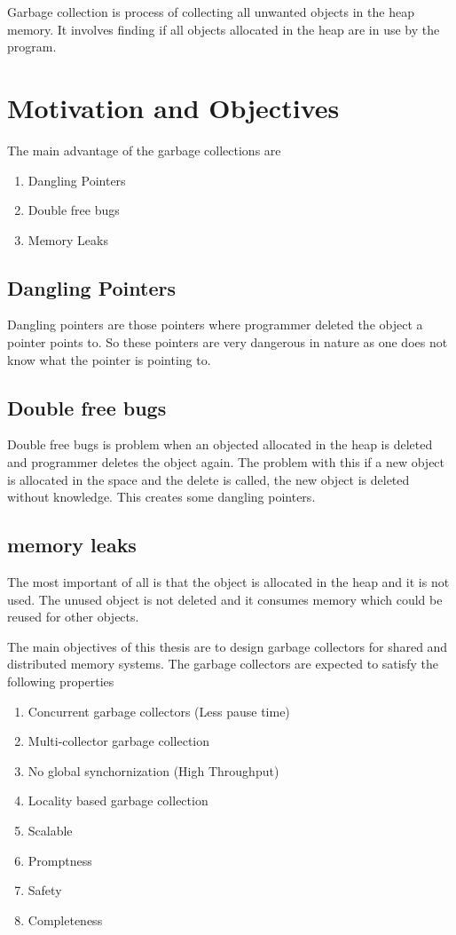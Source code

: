 Garbage collection is process of collecting all unwanted objects in the heap memory. It involves finding if all objects allocated in the heap are in use by the program.
\section{Motivation and Objectives}
\label{intro:motv}
The main advantage of the garbage collections are 
\begin{enumerate}
	\item Dangling Pointers
	\item Double free bugs
	\item Memory Leaks
\end{enumerate}
\subsection{Dangling Pointers}
	Dangling pointers are those pointers where programmer deleted the object a pointer points to. So these pointers are very dangerous in nature as one does not know what the pointer is pointing to.
\subsection{Double free bugs}
	Double free bugs is problem when an objected allocated in the heap is deleted and programmer deletes the object again. The problem with this if a new object is allocated in the space and the delete is called, the new object is deleted without knowledge. This creates some dangling pointers.
\subsection{memory leaks}
	The most important of all is that the object is allocated in the heap and it is not used. The unused object is not deleted and it consumes memory which could be reused for other objects.
	
The main objectives of this thesis are to design garbage collectors for shared and distributed memory systems. The garbage collectors are expected to satisfy the following properties
\begin{enumerate}
	\item Concurrent garbage collectors (Less pause time)
	\item Multi-collector garbage collection
	\item No global synchornization (High Throughput)
	\item Locality based garbage collection
	\item Scalable
	\item Promptness
	\item Safety
	\item Completeness
\end{enumerate}

